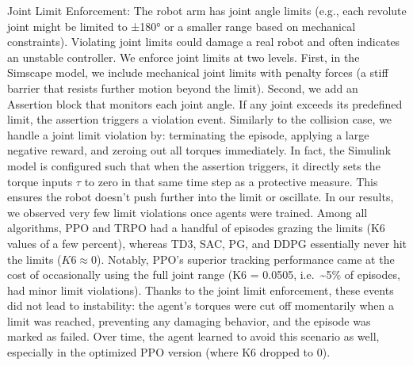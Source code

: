 \documentclass{ieeeaccess}
\begin{document}
Joint Limit Enforcement: The robot arm has joint angle limits (e.g., each revolute joint might be
limited to ±180° or a smaller range based on mechanical constraints). Violating joint limits could
damage a real robot and often indicates an unstable controller. We enforce joint limits at two
levels. First, in the Simscape model, we include mechanical joint limits with penalty forces (a stiff
barrier that resists further motion beyond the limit). Second, we add an Assertion block that
monitors each joint angle. If any joint exceeds its predefined limit, the assertion triggers a
violation event. Similarly to the collision case, we handle a joint limit violation by: terminating
the episode, applying a large negative reward, and zeroing out all torques immediately. In
fact, the Simulink model is configured such that when the assertion triggers, it directly sets the
torque inputs $\tau$ to zero in that same time step as a protective measure. This ensures the
robot doesn’t push further into the limit or oscillate. In our results, we observed very few limit
violations once agents were trained. Among all algorithms, PPO and TRPO had a handful of
episodes grazing the limits (K6 values of a few percent), whereas TD3, SAC, PG, and DDPG
essentially never hit the limits ($K6 \approx 0$). Notably, PPO’s superior tracking performance came
at the cost of occasionally using the full joint range (K6 = 0.0505, i.e.~\textasciitilde5\% of episodes, had minor
limit violations). Thanks to the joint limit enforcement, these events did not lead to
instability: the agent’s torques were cut off momentarily when a limit was reached, preventing
any damaging behavior, and the episode was marked as failed. Over time, the agent learned to
avoid this scenario as well, especially in the optimized PPO version (where K6 dropped to 0).
\end{document}
